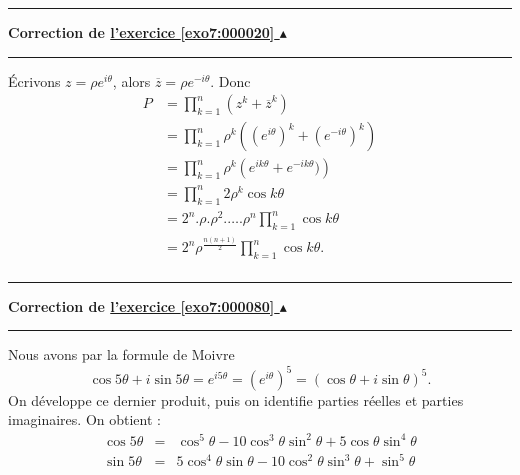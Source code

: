 \documentclass[11pt,a4paper]{article}
\newcounter{exo}
\newcommand{\correction}[1]{\hypertarget{cor7:#1}{}\label{cor7:#1}{\bf Correction de \hyperlink{exo7:#1}{l'exercice \ref{exo7:#1} $\blacktriangle$}}\vspace{1mm}\hrule\vspace{1mm}}
\newcommand{\fincorrection}{\vspace{1mm}\hrule\vspace*{7mm}}
\begin{document}
\fincorrection
\correction{000020}
\'Ecrivons $z = \rho e^{i\theta}$, alors $\overline{z} = \rho
e^{-i\theta}$. Donc
\begin{align*}
P &= \prod_{k=1}^n \left(z^k+{\overline{z}}^k \right)\\
&= \prod_{k=1}^n \rho^k \left(  (e^{i\theta})^k + (e^{-i\theta})^k \right)\\
&= \prod_{k=1}^n \rho^k \left(  e^{ik\theta} + e^{-ik\theta}) \right)\\
&= \prod_{k=1}^n 2 \rho^k \cos {k\theta}\\
&= 2^n.\rho.\rho^2.\ldots.\rho^n \prod_{k=1}^n \cos {k\theta}\\
&= 2^n\rho^{\frac{n(n+1)}{2}} \prod_{k=1}^n \cos {k\theta}.\\
\end{align*}
\fincorrection
\correction{000080}
Nous avons par la formule de Moivre
$$\cos5\theta+i\sin5\theta=e^{i5\theta}=(e^{i\theta})^5=
(\cos\theta+i\sin\theta)^5.$$
On d\'eveloppe ce dernier produit, puis on identifie parties r\'eelles
et parties imaginaires. On obtient :
\begin{eqnarray*}
\cos 5\theta & = & \cos^5\theta -10\cos^3\theta \sin^2\theta
                    +5\cos\theta \sin^4\theta\\
\sin 5\theta & = & 5\cos^4\theta \sin \theta -10\cos^2\theta \sin^3\theta
                   +\sin^5\theta 
\end{eqnarray*}
\end{document}
